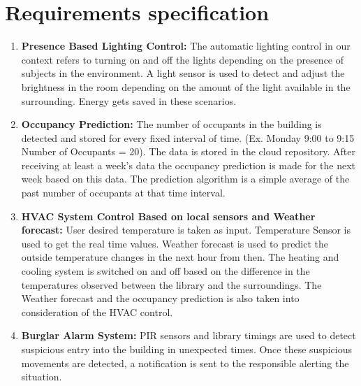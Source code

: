 \documentclass[runningheads]{llncs}
\begin{document}
\section{Requirements specification}
%
\begin{enumerate}
\item\textbf{Presence Based Lighting Control:}
The automatic lighting control in our context refers to turning on and off the lights depending on the presence of subjects in the environment. A light sensor is used to detect and adjust the brightness in the room depending on the amount of the light available in the surrounding. Energy gets saved in these scenarios.

\item\textbf{Occupancy Prediction:}
The number of occupants in the building is detected and stored for every fixed interval of time. (Ex. Monday 9:00 to 9:15 Number of Occupants = 20). The data is stored in the cloud repository. After receiving at least a week’s data the occupancy prediction is made for the next week based on this data. The prediction algorithm is a simple average of the past number of occupants at that time interval. 

\item\textbf{HVAC System Control Based on local sensors and Weather forecast:}
User desired temperature is taken as input. Temperature Sensor is used to get the real time values. Weather forecast is used to predict the outside temperature changes in the next hour from then. The heating and cooling system is switched on and off based on the difference in the temperatures observed between the library and the surroundings. The Weather forecast and the occupancy prediction is also taken into consideration of the HVAC control.

\item\textbf{Burglar Alarm System:}
PIR sensors and library timings are used to detect suspicious entry into the building in unexpected times. Once these suspicious movements are detected, a notification is sent to the responsible alerting the situation.
\end{enumerate}
\end{document}
